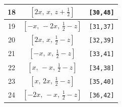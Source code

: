 \documentclass[fleqn,8pt]{jsarticle}
\begin{document}
\begin{longtable}{ccc}
18 & $\left[ 2 x,\, x,\, z + \frac{1}{2} \right]$ & {\tt [30,48]} \\ \hline
19 & $\left[ - x,\, - 2 x,\, \frac{1}{2} - z \right]$ & {\tt [31,37]} \\ \hline
20 & $\left[ 2 x,\, x,\, \frac{1}{2} - z \right]$ & {\tt [32,39]} \\ \hline
21 & $\left[ - x,\, x,\, \frac{1}{2} - z \right]$ & {\tt [33,41]} \\ \hline
22 & $\left[ x,\, - x,\, \frac{1}{2} - z \right]$ & {\tt [34,38]} \\ \hline
23 & $\left[ x,\, 2 x,\, \frac{1}{2} - z \right]$ & {\tt [35,40]} \\ \hline
24 & $\left[ - 2 x,\, - x,\, \frac{1}{2} - z \right]$ & {\tt [36,42]} \\
\end{longtable}
\renewcommand{\arraystretch}{1.2}
\end{document}
